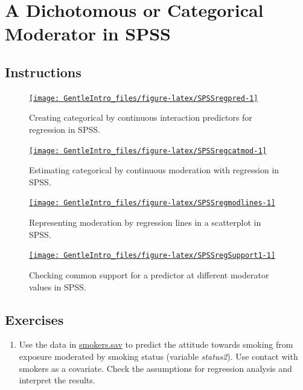 \documentclass[a4paper]{book}
\providecommand{\tightlist}{%
  \setlength{\itemsep}{0pt}\setlength{\parskip}{0pt}}
\theoremstyle{definition}
\theoremstyle{definition}
\theoremstyle{definition}
\theoremstyle{remark}
\begin{document}
\section{A Dichotomous or Categorical Moderator in
SPSS}\label{catmodSPSS}

\subsection{Instructions}\label{instructions-7}

\begin{figure}[H]
\href{https://www.youtube.com/embed/pv6JnWL4nX8}{\texttt{[image: GentleIntro\_files/figure-latex/SPSSregpred-1]} }\caption{Creating categorical by continuous interaction
predictors for regression in SPSS.}\label{fig:SPSSregpred}
\end{figure}

\begin{figure}[H]
\href{https://www.youtube.com/embed/A2VHIsYA66M}{\texttt{[image: GentleIntro\_files/figure-latex/SPSSregcatmod-1]} }\caption{Estimating categorical by continuous moderation with
regression in SPSS.}\label{fig:SPSSregcatmod}
\end{figure}

\begin{figure}[H]
\href{https://www.youtube.com/embed/qZbdMdNoldI}{\texttt{[image: GentleIntro\_files/figure-latex/SPSSregmodlines-1]} }\caption{Representing moderation by regression lines in a
scatterplot in SPSS.}\label{fig:SPSSregmodlines}
\end{figure}

\begin{figure}[H]
\href{https://www.youtube.com/embed/d93Kvm0imio}{\texttt{[image: GentleIntro\_files/figure-latex/SPSSregSupport1-1]} }\caption{Checking common support for a predictor at
different moderator values in SPSS.}\label{fig:SPSSregSupport1}
\end{figure}

\subsection{Exercises}\label{exercises-8}

\begin{enumerate}
\def\labelenumi{\arabic{enumi}.}
\tightlist
\item
  Use the data in
  \href{http://82.196.4.233:3838/data/smokers.sav}{smokers.sav} to
  predict the attitude towards smoking from exposure moderated by
  smoking status (variable \emph{status2}). Use contact with smokers as
  a covariate. Check the assumptions for regression analysis and
  interpret the results.
\end{enumerate}
\end{document}
